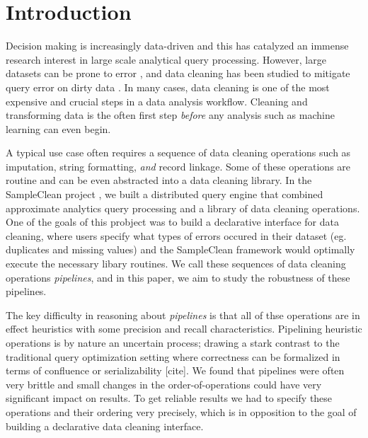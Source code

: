\section{Introduction}
Decision making is increasingly data-driven and this has catalyzed an immense research interest in large scale analytical query processing.
However, large datasets can be prone to error \cite{Gartner}, and data cleaning has been studied to mitigate query error on dirty data \cite{dasu2003exploratory, mayfield2010eracer, openrefine, wrangler, DBLP:conf/sigmod/DallachiesaEEEIOT13, DBLP:conf/pervasive/JefferyAFHW06}.
In many cases, data cleaning is one of the most expensive and crucial steps in a data analysis workflow.
Cleaning and transforming data is the often first step \emph{before} any analysis such as machine learning can even begin.

A typical use case often requires a sequence of data cleaning operations 
such as imputation, string formatting, \emph{and} record linkage.
Some of these operations are routine and can be even abstracted into a data cleaning library.
In the SampleClean project \cite{wang1999sample}, we built a distributed query engine that combined approximate analytics query processing 
and a library of data cleaning operations.
One of the goals of this probject was to build a declarative interface for data cleaning, where users specify what types of errors
occured in their dataset (eg. duplicates and missing values) and the SampleClean framework would optimally execute the necessary libary routines.
We call these sequences of data cleaning operations \emph{pipelines}, and in this paper, we aim to study the robustness of these pipelines.

The key difficulty in reasoning about \emph{pipelines} is that all of thse operations are in effect heuristics with some precision and recall characteristics.
Pipelining heuristic operations is by nature an uncertain process; drawing a stark contrast to the traditional query optimization setting where correctness can be formalized in terms of confluence or serializability [cite]. 
We found that pipelines were often very brittle and small changes in the order-of-operations could have very significant impact on results.
To get reliable results we had to specify these operations and their ordering very precisely, which is in opposition to the goal of building a declarative data cleaning interface.

